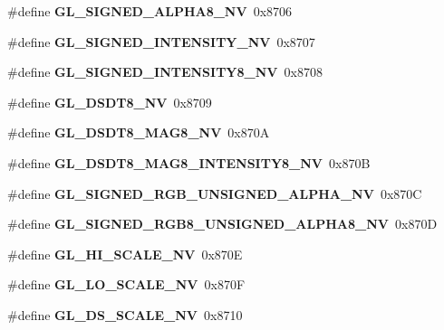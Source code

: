 \begin{DoxyCompactItemize}
\item 
\#define {\bfseries G\+L\+\_\+\+S\+I\+G\+N\+E\+D\+\_\+\+A\+L\+P\+H\+A8\+\_\+\+N\+V}~0x8706\label{_s_d_l__opengl_8h_a462f348c0cf5cf8dca9113de68b4af6c}

\item 
\#define {\bfseries G\+L\+\_\+\+S\+I\+G\+N\+E\+D\+\_\+\+I\+N\+T\+E\+N\+S\+I\+T\+Y\+\_\+\+N\+V}~0x8707\label{_s_d_l__opengl_8h_ad66c6571291ca80c02d3b6e6488efa4b}

\item 
\#define {\bfseries G\+L\+\_\+\+S\+I\+G\+N\+E\+D\+\_\+\+I\+N\+T\+E\+N\+S\+I\+T\+Y8\+\_\+\+N\+V}~0x8708\label{_s_d_l__opengl_8h_a7d3f0f40a1a6203735c2ca78122e8545}

\item 
\#define {\bfseries G\+L\+\_\+\+D\+S\+D\+T8\+\_\+\+N\+V}~0x8709\label{_s_d_l__opengl_8h_a3fc9d88d55fca111f7d2b443f4ae2702}

\item 
\#define {\bfseries G\+L\+\_\+\+D\+S\+D\+T8\+\_\+\+M\+A\+G8\+\_\+\+N\+V}~0x870\+A\label{_s_d_l__opengl_8h_a8a702902dd0ad591aa31579384bff614}

\item 
\#define {\bfseries G\+L\+\_\+\+D\+S\+D\+T8\+\_\+\+M\+A\+G8\+\_\+\+I\+N\+T\+E\+N\+S\+I\+T\+Y8\+\_\+\+N\+V}~0x870\+B\label{_s_d_l__opengl_8h_ad49f0d31410ec1255ae6940dd6902c95}

\item 
\#define {\bfseries G\+L\+\_\+\+S\+I\+G\+N\+E\+D\+\_\+\+R\+G\+B\+\_\+\+U\+N\+S\+I\+G\+N\+E\+D\+\_\+\+A\+L\+P\+H\+A\+\_\+\+N\+V}~0x870\+C\label{_s_d_l__opengl_8h_a007f37f93fe4b54ae4d4510f6da69be0}

\item 
\#define {\bfseries G\+L\+\_\+\+S\+I\+G\+N\+E\+D\+\_\+\+R\+G\+B8\+\_\+\+U\+N\+S\+I\+G\+N\+E\+D\+\_\+\+A\+L\+P\+H\+A8\+\_\+\+N\+V}~0x870\+D\label{_s_d_l__opengl_8h_a0d199ffe01ff6f5b1aa15e911a325a42}

\item 
\#define {\bfseries G\+L\+\_\+\+H\+I\+\_\+\+S\+C\+A\+L\+E\+\_\+\+N\+V}~0x870\+E\label{_s_d_l__opengl_8h_a70f140c54af187cbbe0477e90ec02da8}

\item 
\#define {\bfseries G\+L\+\_\+\+L\+O\+\_\+\+S\+C\+A\+L\+E\+\_\+\+N\+V}~0x870\+F\label{_s_d_l__opengl_8h_a29537cf9351e4e69ce258c83463fa158}

\item 
\#define {\bfseries G\+L\+\_\+\+D\+S\+\_\+\+S\+C\+A\+L\+E\+\_\+\+N\+V}~0x8710\label{_s_d_l__opengl_8h_ae8fbfba00eaab20cf204dddb1586ef33}


\end{DoxyCompactItemize}
